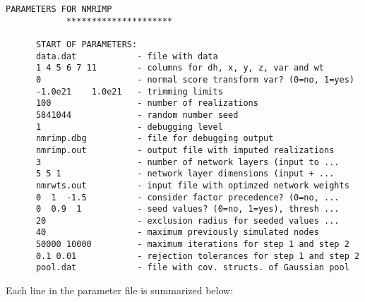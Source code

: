 \begin{framed}
   \begin{lstlisting}[style=ccgParameterfile]
            PARAMETERS FOR NMRIMP
            *********************

      START OF PARAMETERS:
      data.dat            - file with data
      1 4 5 6 7 11        - columns for dh, x, y, z, var and wt
      0                   - normal score transform var? (0=no, 1=yes)
      -1.0e21    1.0e21   - trimming limits
      100                 - number of realizations
      5841044             - random number seed
      1                   - debugging level
      nmrimp.dbg          - file for debugging output
      nmrimp.out          - output file with imputed realizations
      3                   - number of network layers (input to ...
      5 5 1               - network layer dimensions (input + ...
      nmrwts.out          - input file with optimzed network weights
      0  1  -1.5          - consider factor precedence? (0=no, ...
      0  0.9  1           - seed values? (0=no, 1=yes), thresh ...
      20                  - exclusion radius for seeded values ...
      40                  - maximum previously simulated nodes
      50000 10000         - maximum iterations for step 1 and step 2
      0.1 0.01            - rejection tolerances for step 1 and step 2
      pool.dat            - file with cov. structs. of Gaussian pool
    \end{lstlisting}
\end{framed}

Each line in the parameter file is summarized below:

